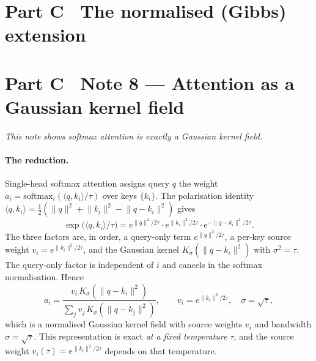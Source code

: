\documentclass[10pt,twocolumn]{article}
\begin{document}
\FloatBarrier
\section*{Part C \textperiodcentered\ The normalised (Gibbs) extension}

\section*{Part C \textperiodcentered\ Note 8 --- Attention as a Gaussian kernel field}
\label{si:attention}
\emph{This note shows softmax attention is exactly a Gaussian kernel field.}
\paragraph{The reduction.} Single-head softmax attention assigns query $q$ the weight $a_i=\mathrm{softmax}_i(\langle q,k_i\rangle/\tau)$ over keys $\{k_i\}$. The polarisation identity $\langle q,k_i\rangle=\tfrac12(\lVert q\rVert^2+\lVert k_i\rVert^2-\lVert q-k_i\rVert^2)$ gives
\begin{equation}
\exp\big(\langle q,k_i\rangle/\tau\big)=e^{\lVert q\rVert^2/2\tau}\cdot e^{\lVert k_i\rVert^2/2\tau}\cdot e^{-\lVert q-k_i\rVert^2/2\tau}.
\end{equation}
The three factors are, in order, a query-only term $e^{\lVert q\rVert^2/2\tau}$, a per-key source weight $v_i=e^{\lVert k_i\rVert^2/2\tau}$, and the Gaussian kernel $K_\sigma(\lVert q-k_i\rVert^2)$ with $\sigma^2=\tau$. The query-only factor is independent of $i$ and cancels in the softmax normalisation. Hence
\begin{equation}
a_i=\frac{v_i\,K_\sigma(\lVert q-k_i\rVert^2)}{\sum_j v_j\,K_\sigma(\lVert q-k_j\rVert^2)},\qquad v_i=e^{\lVert k_i\rVert^2/2\tau},\quad \sigma=\sqrt{\tau},
\end{equation}
which is a normalised Gaussian kernel field with source weights $v_i$ and bandwidth $\sigma=\sqrt\tau$. This representation is exact \emph{at a fixed temperature $\tau$}, and the source weight $v_i(\tau)=e^{\lVert k_i\rVert^2/2\tau}$ depends on that temperature.
\end{document}
